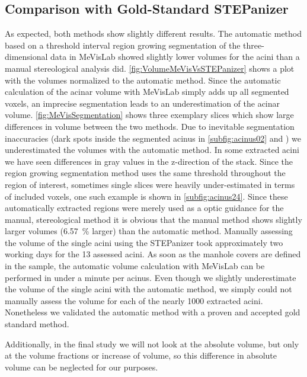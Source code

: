 \documentclass[%
	paper=a4,%
	DIV=calc,%
	twoside=true,%
	abstract=true,%
	]{scrartcl}
\begin{document}
\subsection{Comparison with Gold-Standard STEPanizer}
As expected, both methods show slightly different results. The automatic method based on a threshold interval region growing segmentation of the three-dimensional data in MeVisLab showed slightly lower volumes for the acini than a manual stereological analysis did. \autoref{fig:VolumeMeVisVsSTEPanizer} shows a plot with the volumes normalized to the automatic method. Since the automatic calculation of the acinar volume with MeVisLab simply adds up all segmented voxels, an imprecise segmentation leads to an underestimation of the acinar volume. \autoref{fig:MeVisSegmentation} shows three exemplary slices which show large differences in volume between the two methods. Due to inevitable segmentation inaccuracies (dark spots inside the segmented acinus in \autoref{subfig:acinus02} and ) we underestimated the volumes with the automatic method. In some extracted acini we have seen differences in gray values in the z-direction of the stack. Since the region growing segmentation method uses the same threshold throughout the region of interest, sometimes single slices were heavily under-estimated in terms of included voxels, one such example is shown in \autoref{subfig:acinus24}. Since these automatically extracted regions were merely used as a optic guidance for the manual, stereological method it is obvious that the manual method shows slightly larger volumes (\SI{6.57}{\percent} larger) than the automatic method. Manually assessing the volume of the single acini using the STEPanizer took approximately two working days for the 13 assessed acini. As soon as the manhole covers are defined in the sample, the automatic volume calculation with MeVisLab can be performed in under a minute per acinus. Even though we slightly underestimate the volume of the single acini with the automatic method, we simply could not manually assess the volume for each of the nearly 1000 extracted acini. Nonetheless we validated the automatic method with a proven and accepted gold standard method.

Additionally, in the final study we will not look at the absolute volume, but only at the volume fractions or increase of volume, so this difference in absolute volume can be neglected for our purposes.
\end{document}
